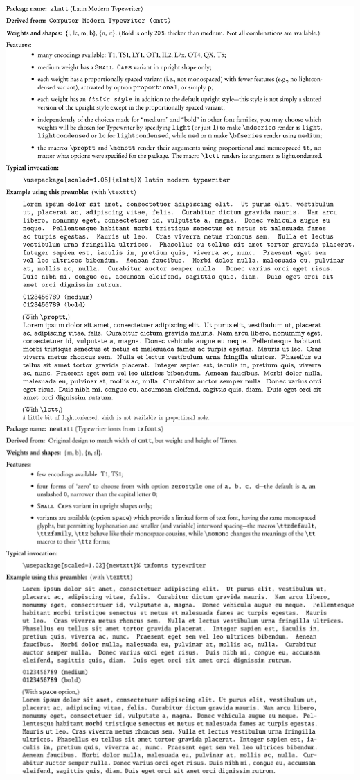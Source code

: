 \documentclass{article}
\begin{document}
\begin{description}
\includegraphics{zlmsamp-crop}
\newpage
\hypertarget{lnk:newtxtt}{}
\includegraphics{newtxttsamp-crop}
\end{description}


\end{document}
